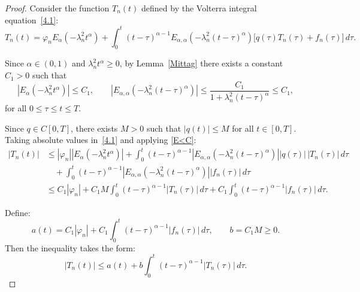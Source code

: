 \documentclass[reqno]{amsart}
\theoremstyle{definition}
\numberwithin{equation}{section}
\begin{document}
\begin{proof}
Consider the function $T_n(t)$ defined by the Volterra integral 
equation~\eqref{4.1}:
\begin{equation*}
T_n(t) = \varphi_n E_{\alpha}\!\left(-\lambda_n^2 t^{\alpha}\right)
+ \int_0^t (t-\tau)^{\alpha-1}
  E_{\alpha,\alpha}\!\left(-\lambda_n^2(t-\tau)^{\alpha}\right)
  \bigl[q(\tau)T_n(\tau)+f_n(\tau)\bigr]\,d\tau.
\end{equation*}


Since $\alpha\in(0,1)$ and $\lambda_n^2 t^\alpha \geq 0$, by 
Lemma~\ref{Mittag} there exists a constant $C_1>0$ such that
\begin{equation}\label{E<C}
    \left|E_{\alpha}\!\left(-\lambda_n^2 t^{\alpha}\right)\right| 
    \leq C_1, 
    \qquad
    \left|E_{\alpha,\alpha}\!\left(-\lambda_n^2(t-\tau)^{\alpha}\right)\right| 
    \leq \frac{C_1}{1+\lambda_n^2(t-\tau)^{\alpha}} \leq C_1,
\end{equation}
for all $0\leq\tau\leq t\leq T$.

Since $q\in C[0,T]$, there exists $M>0$ such that 
$|q(t)|\leq M$ for all $t\in[0,T]$. 
Taking absolute values in~\eqref{4.1} and applying \eqref{E<C}:
\begin{align*}
|T_n(t)| 
&\leq |\varphi_n|\left|E_{\alpha}\!\left(-\lambda_n^2 t^{\alpha}\right)\right|
 + \int_0^t (t-\tau)^{\alpha-1}
   \left|E_{\alpha,\alpha}\!\left(-\lambda_n^2(t-\tau)^{\alpha}\right)\right|
   |q(\tau)|\,|T_n(\tau)|\,d\tau \\
&\quad + \int_0^t (t-\tau)^{\alpha-1}
   \left|E_{\alpha,\alpha}\!\left(-\lambda_n^2(t-\tau)^{\alpha}\right)\right|
   |f_n(\tau)|\,d\tau \\[4pt]
&\leq C_1|\varphi_n|
 + C_1 M\int_0^t (t-\tau)^{\alpha-1}|T_n(\tau)|\,d\tau
 + C_1\int_0^t (t-\tau)^{\alpha-1}|f_n(\tau)|\,d\tau.
\end{align*}

Define:
\begin{equation}\label{a_t}
    a(t) = C_1|\varphi_n| 
           + C_1\int_0^t (t-\tau)^{\alpha-1}|f_n(\tau)|\,d\tau,
    \qquad b= C_1 M \geq 0.
\end{equation}
Then the inequality takes the form:
\begin{equation}\label{weakly_singular}
    |T_n(t)| \leq a(t) + b\int_0^t (t-\tau)^{\alpha-1}|T_n(\tau)|\,d\tau.
\end{equation}



\end{proof}
\end{document}
